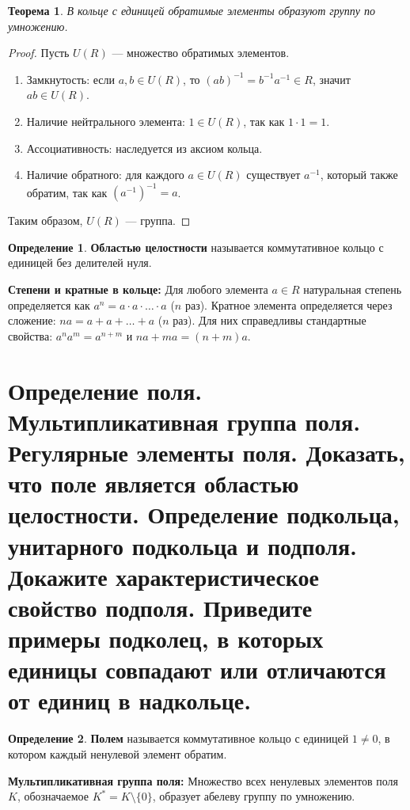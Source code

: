 \documentclass[12pt, a4paper]{article}
\theoremstyle{definition}
\newtheorem{definition}{Определение}[section]
\theoremstyle{plain}
\newtheorem{theorem}{Теорема}[section]
\begin{document}
	\begin{theorem}
		В кольце с единицей обратимые элементы образуют группу по умножению.
	\end{theorem}
	\begin{proof}
		Пусть $U(R)$ — множество обратимых элементов.
		\begin{enumerate}
			\item Замкнутость: если $a, b \in U(R)$, то $(ab)^{-1} = b^{-1}a^{-1} \in R$, значит $ab \in U(R)$.
			\item Наличие нейтрального элемента: $1 \in U(R)$, так как $1 \cdot 1 = 1$.
			\item Ассоциативность: наследуется из аксиом кольца.
			\item Наличие обратного: для каждого $a \in U(R)$ существует $a^{-1}$, который также обратим, так как $(a^{-1})^{-1} = a$.
		\end{enumerate}
		Таким образом, $U(R)$ — группа.
	\end{proof}
	
	\begin{definition}
		\textbf{Областью целостности} называется коммутативное кольцо с единицей без делителей нуля.
	\end{definition}
	
	\textbf{Степени и кратные в кольце:} Для любого элемента $a \in R$ натуральная степень определяется как $a^n = a \cdot a \cdot \dots \cdot a$ ($n$ раз). Кратное элемента определяется через сложение: $na = a + a + \dots + a$ ($n$ раз). Для них справедливы стандартные свойства: $a^n a^m = a^{n+m}$ и $na + ma = (n+m)a$.
	
	\newpage
	\section{Определение поля. Мультипликативная группа поля. Регулярные элементы поля. Доказать, что поле является областью целостности. Определение подкольца, унитарного подкольца и подполя. Докажите характеристическое свойство подполя. Приведите примеры подколец, в которых единицы совпадают или отличаются от единиц в надкольце.}
	
	\begin{definition}
		\textbf{Полем} называется коммутативное кольцо с единицей $1 \neq 0$, в котором каждый ненулевой элемент обратим.
	\end{definition}
	
	\textbf{Мультипликативная группа поля:} Множество всех ненулевых элементов поля $K$, обозначаемое $K^* = K \setminus \{0\}$, образует абелеву группу по умножению.
	
\end{document}
